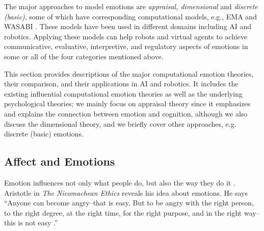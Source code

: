 \documentclass[12pt]{report}
\begin{document}
The major approaches to model emotions are \textit{appraisal, dimensional} and
\textit{discrete (basic)}, some of which have corresponding computational
models, e.g., EMA \cite{marsella:ema-process-model} and WASABI
\cite{becker:wasabi,becker:wasabi-description}. These models have been used in
different domains including AI and robotics. Applying these models can help
robots and virtual agents to achieve communicative, evaluative, interpretive,
and regulatory aspects of emotions in some or all of the four categories
mentioned above.

This section provides descriptions of the major computational emotion theories,
their comparison, and their applications in AI and robotics. It includes the
existing influential computational emotion theories as well as the underlying
psychological theories; {\color{red}we mainly focus on appraisal theory since it
emphasizes and explains the connection between emotion and cognition, although we also
discuss the dimensional theory, and we briefly cover other approaches, e.g.
discrete (basic) emotions.}

\subsection{Affect and Emotions}
Emotion influences not only what people do, but also the way they do it
\cite{cowie:concepts-definitions}. Aristotle in \emph{The Nicomachean Ethics}
reveals his idea about emotions. He says ``Anyone can become angry--that is
easy. But to be angry with the right person, to the right degree, at the right
time, for the right purpose, and in the right way--this is not easy
\cite{aristotle:ethics}.''
\end{document}
